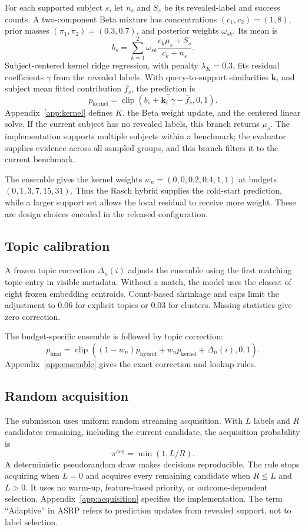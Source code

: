 \documentclass{article}
\begin{document}
For each supported subject $s$, let $n_s$ and $S_s$ be its revealed-label and success counts. A two-component Beta mixture has concentrations $(c_1,c_2)=(1,8)$, prior masses $(\pi_1,\pi_2)=(0.3,0.7)$, and posterior weights $\omega_{sk}$. Its mean is
\[
 b_s=\sum_{k=1}^{2}\omega_{sk}\frac{c_k\mu_s+S_s}{c_k+n_s}.
\]
Subject-centered kernel ridge regression, with penalty $\lambda_K=0.3$, fits residual coefficients $\gamma$ from the revealed labels. With query-to-support similarities $\mathbf k_i$ and subject mean fitted contribution $\bar f_s$, the prediction is
\[
 p_{\mathrm{kernel}}=\operatorname{clip}\!\left(b_s+\mathbf k_i^\top\gamma-\bar f_s,0,1\right).
\]
Appendix~\ref{app:kernel} defines $K$, the Beta weight update, and the centered linear solve. If the current subject has no revealed labels, this branch returns $\mu_s$. The implementation supports multiple subjects within a benchmark; the evaluator supplies evidence across all sampled groups, and this branch filters it to the current benchmark.

The ensemble gives the kernel weights $w_n=(0,0,0.2,0.4,1,1)$ at budgets $(0,1,3,7,15,31)$. Thus the Rasch hybrid supplies the cold-start prediction, while a larger support set allows the local residual to receive more weight. These are design choices encoded in the released configuration.

\subsection{Topic calibration}\label{sec:calibration}

A frozen topic correction $\Delta_n(i)$ adjusts the ensemble using the first matching topic entry in visible metadata. Without a match, the model uses the closest of eight frozen embedding centroids. Count-based shrinkage and caps limit the adjustment to $0.06$ for explicit topics or $0.03$ for clusters. Missing statistics give zero correction.

The budget-specific ensemble is followed by topic correction:
\[
 p_{\mathrm{final}}=\operatorname{clip}\!\left(
 (1-w_n)p_{\mathrm{hybrid}}+w_n p_{\mathrm{kernel}}+\Delta_n(i),0,1\right).
\]
Appendix~\ref{app:ensemble} gives the exact correction and lookup rules.

\subsection{Random acquisition}\label{sec:acquisition}

The submission uses uniform random streaming acquisition. With $L$ labels and $R$ candidates remaining, including the current candidate, the acquisition probability is
\[
 \pi^{\mathrm{acq}}=\min(1,L/R).
\]
A deterministic pseudorandom draw makes decisions reproducible. The rule stops acquiring when $L=0$ and acquires every remaining candidate when $R\le L$ and $L>0$. It uses no warm-up, feature-based priority, or outcome-dependent selection. Appendix~\ref{app:acquisition} specifies the implementation. The term ``Adaptive'' in ASRP refers to prediction updates from revealed support, not to label selection.
\end{document}

